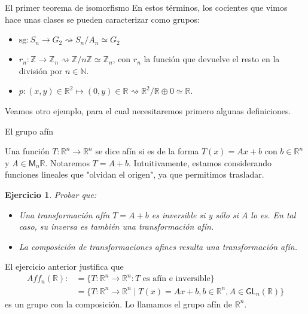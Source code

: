 \documentclass{beamer}
\def\N{\mathbb{N}}
\def\Z{\mathbb{Z}}
\def\R{\mathbb{R}}
\def\sg{\mathrm{sg}}
\newtheorem{ejercicio}[teorema]{Ejercicio}
\begin{document}
\begin{frame}{El primer teorema de isomorfismo}
En estos términos, los cocientes que vimos hace unas clases se pueden caracterizar \alert{como grupos}:
\begin{itemize}
 \item $\sg : S_n \to G_2 \rightsquigarrow S_n/A_n \simeq G_2$
 \item $r_n : \Z \to \Z_n \rightsquigarrow \Z/n\Z \simeq \Z_n$, con $r_n$ la función que devuelve el resto en la división por $n \in \N$.
 \item $p : (x,y) \in \R^2 \mapsto (0,y) \in \R \rightsquigarrow \R^2/\R \oplus 0 \simeq \R$. 
\end{itemize}
\medskip \medskip
{} Veamos otro ejemplo, para el cual necesitaremos primero algunas definiciones.
\end{frame}  

\begin{frame}{El grupo afín}

Una función $T : \R^n \to \R^n$ se dice \alert{afín} si es de la forma $T(x) = Ax + b$ con $b \in \R^n$ y $A \in \mathsf{M}_n\R$. Notaremos $T = A + b$. Intuitivamente, estamos considerando funciones lineales que "olvidan el origen", ya que permitimos trasladar.

\begin{ejercicio} Probar que:
\begin{itemize}
 \item Una transformación afín $T = A + b$ es inversible si y sólo si $A$ lo es. En tal caso, su inversa es también una transformación afín.
 \item La composición de transformaciones afines resulta una transformación afín. 
\end{itemize}
\end{ejercicio}

El ejercicio anterior justifica que 
\begin{align*}
Aff_n(\R) :&= \{T : \R^n \to \R^n : \text{$T$ es afín e inversible} \}\\
&= \{T : \R^n \to \R^n \mid T(x) = Ax + b, b \in \R^n, A \in \mathsf{GL}_n(\R)\}
\end{align*}
es un grupo con la composición. Lo llamamos el \alert{grupo afín} de $\R^n$.
\end{frame}
\end{document}
